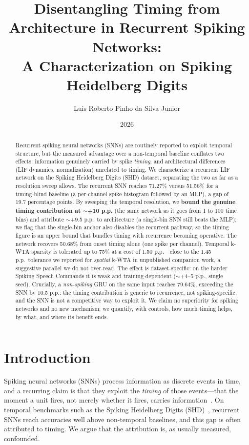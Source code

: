 \documentclass[11pt]{article}
\title{Disentangling Timing from Architecture in Recurrent Spiking Networks:\\A Characterization on Spiking Heidelberg Digits}
\author[1]{Luis Roberto Pinho da Silva Junior}
\affil[1]{Independent research \\ \url{https://github.com/luisroberto0/project-hebb}}
\date{2026}
\begin{document}
\maketitle

\begin{abstract}
Recurrent spiking neural networks (SNNs) are routinely reported to exploit temporal structure, but the measured advantage over a non-temporal baseline conflates two effects: information genuinely carried by spike \emph{timing}, and architectural differences (LIF dynamics, normalization) unrelated to timing. We characterize a recurrent LIF network on the Spiking Heidelberg Digits (SHD) dataset, separating the two as far as a resolution sweep allows. The recurrent SNN reaches 71.27\% versus 51.56\% for a timing-blind baseline (a per-channel spike histogram followed by an MLP), a gap of 19.7 percentage points. By sweeping the temporal resolution, we \textbf{bound the genuine timing contribution at $\sim$+10 p.p.} (the same network as it goes from 1 to 100 time bins) and attribute $\sim$+9.5 p.p.\ to architecture (a single-bin SNN still beats the MLP); we flag that the single-bin anchor also disables the recurrent pathway, so the timing figure is an upper bound that bundles timing with recurrence becoming operative. The network recovers 50.68\% from onset timing alone (one spike per channel). Temporal k-WTA sparsity is tolerated up to 75\% at a cost of 1.50 p.p.---close to the 1.45 p.p.\ tolerance we reported for \emph{spatial} k-WTA in unpublished companion work, a suggestive parallel we do not over-read. The effect is dataset-specific: on the harder Spiking Speech Commands it is weak and training-dependent ($\sim$+4--5 p.p., single seed). Crucially, a \emph{non-spiking} GRU on the same input reaches 79.64\%, exceeding the SNN by 10.5 p.p.: the timing contribution is generic to recurrence, not spiking-specific, and the SNN is not a competitive way to exploit it. We claim no superiority for spiking networks and no new mechanism; we quantify, with controls, how much timing helps, by what, and where its benefit ends.
\end{abstract}

\section{Introduction}
\label{sec:intro}

Spiking neural networks (SNNs) process information as discrete events in time, and a recurring claim is that they exploit the \emph{timing} of those events---that the moment a unit fires, not merely whether it fires, carries information~\citep{maass1997networks}. On temporal benchmarks such as the Spiking Heidelberg Digits (SHD)~\citep{cramer2020heidelberg}, recurrent SNNs reach accuracies well above non-temporal baselines, and this gap is often attributed to timing. We argue that the attribution is, as usually measured, confounded.
\end{document}
